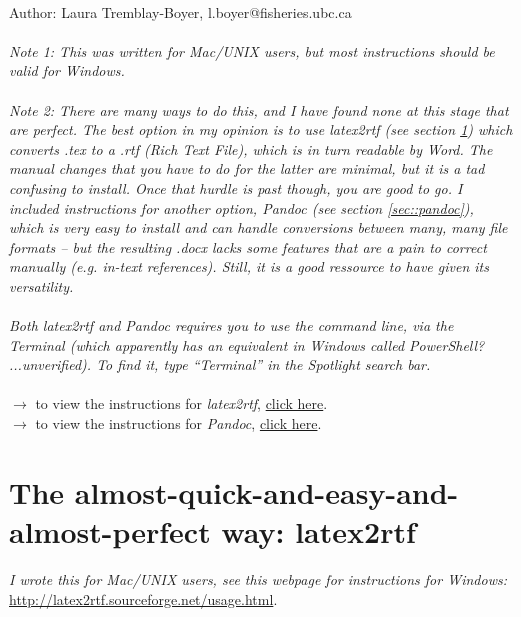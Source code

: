 \documentclass{article}
\begin{document}
\\
Author: Laura Tremblay-Boyer, l.boyer@fisheries.ubc.ca\\
\\
\emph{Note 1: This was written for Mac/UNIX users, but most instructions should be
valid for Windows.}\\
\\
\emph{Note 2: There are many ways to do this, and I have found none at this stage
that are perfect. The best option in my opinion is to use latex2rtf
(see section \ref{sec::rtf}) which converts .tex to a .rtf (Rich Text File),
which is in turn readable by Word. The manual changes that you have to
do for the latter are minimal, but it is a tad confusing to
install. Once that hurdle is past though, you are good to go. I
included instructions for another option, Pandoc (see section \ref{sec::pandoc}), which is very easy
to install and can handle conversions between many, many file formats -- but
the resulting .docx lacks some features that are a pain to correct
manually (e.g. in-text references). Still, it is a good ressource to
have given its versatility.}\\
\\
\emph{Both latex2rtf and Pandoc requires you to use the command line,
  via the Terminal (which apparently has an equivalent in Windows called
PowerShell? ...unverified). To find it, type ``Terminal'' in the
Spotlight search bar.}\\
\\
\noindent $\rightarrow$ to view the instructions for \emph{latex2rtf}, \hyperref[sec::rtf]{click here}.\\
\noindent $\rightarrow$ to view the instructions for \emph{Pandoc}, \hyperref[sec::pandoc]{click here}.

\section{The almost-quick-and-easy-and-almost-perfect way:
  latex2rtf}
\label{sec::rtf}
\emph{I wrote this for Mac/UNIX users, see this webpage for instructions
  for Windows:} \url{http://latex2rtf.sourceforge.net/usage.html}.
\end{document}
